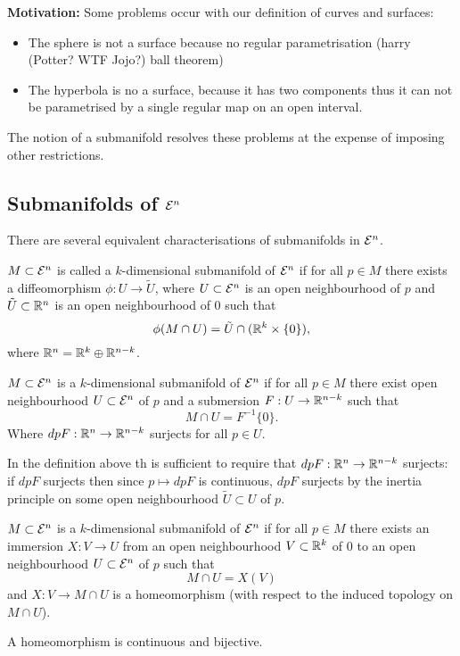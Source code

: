 \textbf{Motivation:} Some problems occur with our definition of curves and surfaces:
\begin{itemize}
	\item The sphere is not a surface because no regular parametrisation  (harry (Potter? WTF Jojo?) ball theorem)
	\item The hyperbola is no a surface, because it has two components thus it can not be parametrised by a single regular map on an open interval.
\end{itemize}

The notion of a submanifold resolves these problems at the expense of imposing other restrictions.

\subsection{Submanifolds of $\mathcal E^n$}
There are several equivalent characterisations of submanifolds in $\mathcal E^n$.

\begin{definition}
	$M \subset \mathcal E^n$ is called a $k$-dimensional submanifold of $\mathcal E^n$ if for all $p \in M$ there exists a diffeomorphism $\phi: U \to \tilde U$, where $U \subset \mathcal E^n$ is an open neighbourhood of $p$ and $\tilde U \subset \mathbb R^n$ is an open neighbourhood of $0$ such that
		\[ \phi(M \cap U)= \tilde U \cap (\mathbb R^k \times \{0\}), \]
	where $\mathbb R^n = \mathbb R^k \oplus \mathbb R^{n-k}$.
\end{definition}

\begin{definition}
	$M \subset \mathcal E^n$ is a $k$-dimensional submanifold of $\mathcal E^n$ if for all $p \in M$ there exist open neighbourhood $U \subset \mathcal E^n$ of $p$ and a submersion $F: U \to \mathbb R^{n-k}$ such that
		\[ M \cap U = F^{-1}\{0\}. \]
	Where $dpF: \mathbb R^n \to \mathbb R^{n-k}$ surjects for all $p \in U$.
\end{definition}

\begin{remark}
	In the definition above th is sufficient to require that $dpF: \mathbb R^n \to \mathbb R^{n-k}$ surjects: if $dpF$ surjects then since $p \mapsto dpF$ is continuous, $dpF$ surjects by the inertia principle on some open neighbourhood $\tilde U \subset U$ of $p$.
\end{remark}

\begin{definition}
	$M \subset \mathcal E^n$ is a $k$-dimensional submanifold of $\mathcal E^n$ if for all $p \in M$ there exists an immersion $X: V \to U$ from an open neighbourhood $V \subset \mathbb R^k$ of $0$ to an open neighbourhood $U \subset \mathcal E^n$ of $p$ such that
		\[ M \cap U = X(V) \]
	and $X:V \to M \cap U$ is a homeomorphism (with respect to the induced topology on $M \cap U$).
	
	A homeomorphism is continuous and bijective.
\end{definition}

